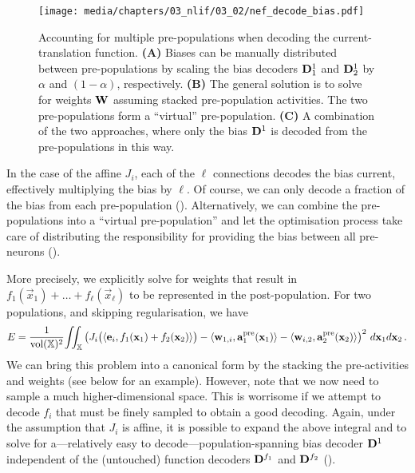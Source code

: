 \begin{figure}
	\texttt{[image: media/chapters/03\_nlif/03\_02/nef\_decode\_bias.pdf]}%
	{\label{fig:nef_decode_bias_a}}%
	{\label{fig:nef_decode_bias_b}}%
	{\label{fig:nef_decode_bias_c}}%
	\caption[Accounting for multiple pre-populations when decoding the current-translation function]{Accounting for multiple pre-populations when decoding the current-translation function. \textbf{(A)} Biases can be manually distributed between pre-populations by scaling the bias decoders $\mathbf{D}^1_1$ and $\mathbf{D}^1_2$ by $\alpha$ and $(1 - \alpha)$, respectively. \textbf{(B)} The general solution is to solve for weights $\mathbf{W}$ assuming stacked pre-population activities. The two pre-populations form a \enquote{virtual} pre-population. \textbf{(C)} A combination of the two approaches, where only the bias $\mathbf{D}^1$ is decoded from the pre-populations in this way.}
\end{figure}

In the case of the affine $J_i$, each of the $\ell$ connections decodes the bias current, effectively multiplying the bias by $\ell$.
Of course, we can only decode a fraction of the bias from each pre-population ().
Alternatively, we can combine the pre-populations into a \enquote{virtual pre-population} and let the optimisation process take care of distributing the responsibility for providing the bias between all pre-neurons ().

More precisely, we explicitly solve for weights that result in $f_1(\vec x_1) + \ldots + f_\ell(\vec x_\ell)$ to be represented in the post-population.
For two populations, and skipping regularisation, we have
\begin{align}
	E =
	\frac{1}{\operatorname{vol}(\mathbb{X})^2} \! \iint_{\mathbb{X}}
	\left(
		J_i\bigl(\langle \mathbf{e}_i, f_1(\mathbf{x}_1) + f_2(\mathbf{x}_2) \rangle\bigr)
		- \langle \mathbf{w}_{1, i}, \mathbf{a}_1^\mathrm{pre}(\mathbf{x}_1) \rangle
		- \langle \mathbf{w}_{i, 2}, \mathbf{a}_2^\mathrm{pre}(\mathbf{x}_2) \rangle
	\right)^2 \, d\mathbf{x}_1 d\mathbf{x}_2 \,.
	\label{eqn:decode_current_additive}
\end{align}
We can bring this problem into a canonical form by the stacking the pre-activities and weights (see below for an example).
However, note that we now need to sample a much higher-dimensional space.
This is worrisome if we attempt to decode $f_i$ that must be finely sampled to obtain a good decoding.
Again, under the assumption that $J_i$ is affine, it is possible to expand the above integral and to solve for a---relatively easy to decode---population-spanning bias decoder $\mathbf{D}^1$ independent of the (untouched) function decoders $\mathbf{D}^{f_1}$ and $\mathbf{D}^{f_2}$ ().

